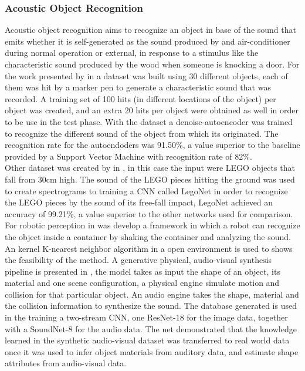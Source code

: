 \subsubsection{Acoustic Object Recognition}

Acoustic object recognition aims to recognize an object in base of the sound that emits whether it is self-generated as the sound produced by and air-conditioner during normal operation or external, in response to a stimulus like the characteristic sound produced by the wood when someone is knocking a door. For the work presented by \citeauthor{AOR1} in \cite{AOR1} a dataset was built using 30 different objects, each of them was hit by a marker pen to generate a characteristic sound that was recorded. A training set of 100 hits (in different locations of the object) per object was created, and an extra 20 hits per object were obtained as well in order to be use in the test phase. With the dataset a denoise-autoencoder was trained to recognize the different sound of the object from which its originated. The recognition rate for the autoendoders was 91.50\%, a value superior to the baseline provided by a Support Vector Machine with recognition rate of 82\%. \\
Other dataset was created by \citeauthor{AOR2_LEGO} in \cite{AOR2_LEGO}, in this case the input were LEGO objects that fall from 30cm high. The sound  of the LEGO pieces hitting the ground was used to create spectrograms to training a CNN called LegoNet in order to recognize the LEGO pieces by the sound of its free-fall impact, LegoNet achieved an accuracy of 99.21\%, a value superior to the other networks used for comparison. For robotic perception in \cite{AOR3_ROBOT} was develop a framework in which a robot can recognize the object inside a container by shaking the container and analyzing the sound. An kernel K-nearest neighbor algorithm in a open environment is used to shows the feasibility of the method. A generative physical, audio-visual synthesis pipeline is presented in \cite{AOR4}, the model takes as input the shape of an object, its material and one scene configuration, a physical engine simulate motion and collision for that particular object. An audio engine takes the shape, material and the collision information to synthesize the sound. The database generated is used in the training a two-stream CNN, one ResNet-18 for the image data, together with a SoundNet-8 for the audio data. The net demonstrated that the knowledge learned in the synthetic audio-visual dataset was transferred to real world data once it was used to infer object materials from auditory data, and estimate shape attributes from audio-visual data.

